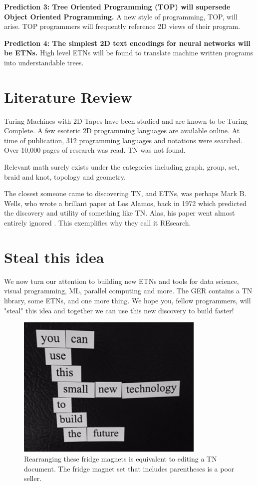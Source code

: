\documentclass[journal]{IEEEtran}
\begin{document}
\textbf{Prediction 3: Tree Oriented Programming (TOP) will supersede Object Oriented Programming.} A new style of programming, TOP, will arise. TOP programmers will frequently reference 2D views of their program.

\textbf{Prediction 4: The simplest 2D text encodings for neural networks will be ETNs.} High level ETNs will be found to translate machine written programs into understandable trees.

\section{Literature Review}

Turing Machines with 2D Tapes have been studied and are known to be Turing Complete\cite{Toida}. A few esoteric 2D programming languages are available online\cite{Ender}. At time of publication, 312 programming languages and notations were searched. Over 10,000 pages of research was read. TN was not found.

Relevant math surely exists under the categories including graph, group, set, braid and knot, topology and geometry.

The closest someone came to discovering TN, and ETNs, was perhaps Mark B. Wells, who wrote a brillant paper at Los Alamos, back in 1972 which predicted the discovery and utility of something like TN. Alas, his paper went almost entirely ignored \cite{Wells}. This exemplifies why they call it REsearch.

\section{Steal this idea}

We now turn our attention to building new ETNs and tools for data science, visual programming, ML, parallel computing and more. The GER contains a TN library, some ETNs, and one more thing. We hope you, fellow programmers, will "steal" this idea and together we can use this new discovery to build faster!
\begin{figure}[ht!]
\centering
\includegraphics[width=90mm]{tree.jpg}
\caption{Rearranging these fridge magnets is equivalent to editing a TN document. The fridge magnet set that includes parentheses is a poor seller.}
\end{figure}
\end{document}
